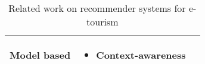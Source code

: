 \begin{table*}[h!]
\begin{tabular}{ |>{\centering\arraybackslash}m{3cm}|>{\centering\arraybackslash}m{1cm}|>{\centering\arraybackslash}m{2.7cm}| }
            Model based &
        
            \begin{itemize}
                \item Context-awareness
            \end{itemize}

        \\

        \hline
    \end{tabular}
    \caption{Related work on recommender systems for e-tourism}
    \label{table:related-work}
    \end{table*}



